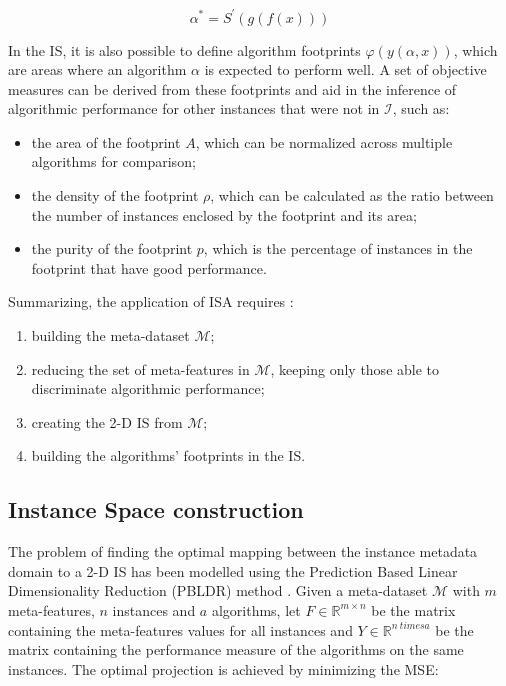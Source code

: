 \begin{equation}
	\alpha^* = S^\prime(g(f(x)))
\end{equation}

In the IS, it is also possible to define algorithm footprints $\varphi(y(\alpha, x))$, which are areas where an algorithm $\alpha$ is expected to perform well. A set of objective measures can be derived from these footprints and aid in the inference of algorithmic performance for other instances that were not in $\mathcal{I}$, such as: 

\begin{itemize}
	\item the area of the footprint $A$, which can be normalized across multiple algorithms for comparison;
	\item the density of the footprint $\rho$, which can be calculated as the ratio between the number of instances enclosed by the footprint and its area;
	\item the purity of the footprint $p$, which is the percentage of instances in the footprint that have good performance.
\end{itemize}

Summarizing, the application of ISA requires \cite{Munoz2018}:

\begin{enumerate}
	\item building the meta-dataset $\mathcal{M}$;
	\item reducing the set of meta-features in $\mathcal{M}$, keeping only those able to discriminate algorithmic performance;
	\item creating the 2-D IS from $\mathcal{M}$;
	\item building the algorithms' footprints in the IS.
\end{enumerate}

\subsection{Instance Space construction}

The problem of finding the optimal mapping between the instance metadata domain to a 2-D IS has been modelled using the Prediction Based Linear Dimensionality Reduction (PBLDR) method \cite{SmithMiles2023}. Given a meta-dataset $\mathcal{M}$ with $m$ meta-features, $n$ instances and $a$ algorithms, let $F \in \mathbb{R}^{m \times n}$ be the matrix containing the meta-features values for all instances and $Y \in \mathbb{R}^{n \ times a}$ be the matrix containing the performance measure of the algorithms on the same instances. The optimal projection is achieved by minimizing the MSE:

